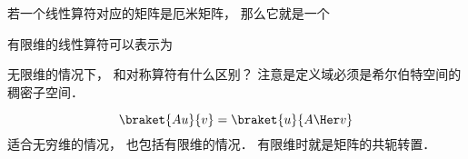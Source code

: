 
\begin{issues}
\issueDraft
\end{issues}



若一个线性算符对应的矩阵是厄米矩阵， 那么它就是一个

有限维的线性算符可以表示为

无限维的情况下， 和对称算符有什么区别？ 注意是定义域必须是希尔伯特空间的稠密子空间．


\begin{equation}
\braket{Au}{v} = \braket{u}{A\Her v}
\end{equation}
适合无穷维的情况， 也包括有限维的情况． 有限维时就是矩阵的共轭转置．
